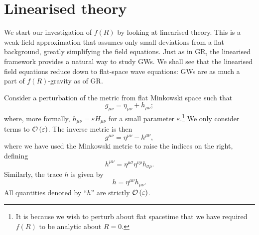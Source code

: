 \section{Linearised theory\label{sec:Lin}}

We start our investigation of $f(R)$ by looking at linearised theory. This is a weak-field approximation that assumes only small deviations from a flat background, greatly simplifying the field equations. Just as in GR, the linearised framework provides a natural way to study GWs. We shall see that the linearised field equations reduce down to flat-space wave equations: GWs are as much a part of $f(R)$-gravity as of GR.

Consider a perturbation of the metric from flat Minkowski space such that
\begin{equation}
g_{\mu\nu} = \eta_{\mu\nu} + h_{\mu\nu};
\end{equation}
where, more formally, $h_{\mu\nu} = \varepsilon H_{\mu\nu}$ for a small parameter $\varepsilon$.\footnote{It is because we wish to perturb about flat spacetime that we have required $f(R)$ to be analytic about $R = 0$.} We only consider terms to $\mathcal{O}\left({\varepsilon}\right)$. The inverse metric is then
\begin{equation}
g^{\mu\nu} = \eta^{\mu\nu} - h^{\mu\nu},
\end{equation}
where we have used the Minkowski metric to raise the indices on the right, defining
\begin{equation}
h^{\mu\nu} = \eta^{\mu\sigma}\eta^{\nu\rho}h_{\sigma\rho}.
\end{equation}
Similarly, the trace $h$ is given by
\begin{equation}
h = \eta^{\mu\nu}h_{\mu\nu}.
\end{equation}
All quantities denoted by ``$h$'' are strictly $\mathcal{O}\left({\varepsilon}\right)$.

